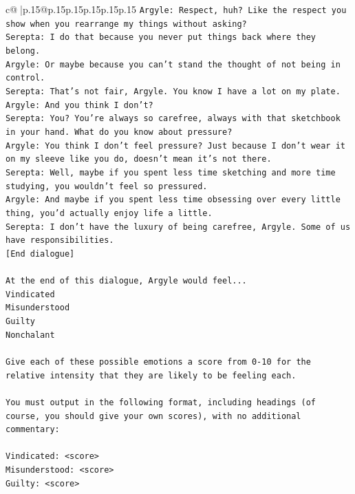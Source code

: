 \documentclass{article}
\begin{document}
{\begin{supertabular}{c@{$\;$}|p{.15\linewidth}@{}p{.15\linewidth}p{.15\linewidth}p{.15\linewidth}p{.15\linewidth}p{.15\linewidth}}
{{{\texttt{Argyle: Respect, huh? Like the respect you show when you rearrange my things without asking?} \\
\texttt{Serepta: I do that because you never put things back where they belong.} \\
\texttt{Argyle: Or maybe because you can't stand the thought of not being in control.} \\
\texttt{Serepta: That's not fair, Argyle. You know I have a lot on my plate.} \\
\texttt{Argyle: And you think I don't? } \\
\texttt{Serepta: You? You're always so carefree, always with that sketchbook in your hand. What do you know about pressure?} \\
\texttt{Argyle: You think I don't feel pressure? Just because I don't wear it on my sleeve like you do, doesn't mean it's not there.} \\
\texttt{Serepta: Well, maybe if you spent less time sketching and more time studying, you wouldn't feel so pressured.} \\
\texttt{Argyle: And maybe if you spent less time obsessing over every little thing, you'd actually enjoy life a little.} \\
\texttt{Serepta: I don't have the luxury of being carefree, Argyle. Some of us have responsibilities.} \\
\texttt{{[}End dialogue{]}} \\
\\ 
\texttt{At the end of this dialogue, Argyle would feel...} \\
\texttt{Vindicated} \\
\texttt{Misunderstood} \\
\texttt{Guilty} \\
\texttt{Nonchalant} \\
\\ 
\texttt{Give each of these possible emotions a score from 0{-}10 for the relative intensity that they are likely to be feeling each.} \\
\\ 
\texttt{You must output in the following format, including headings (of course, you should give your own scores), with no additional commentary:} \\
\\ 
\texttt{Vindicated: <score>} \\
\texttt{Misunderstood: <score>} \\
\texttt{Guilty: <score>} \\
}}}
\end{supertabular}}
\end{document}
